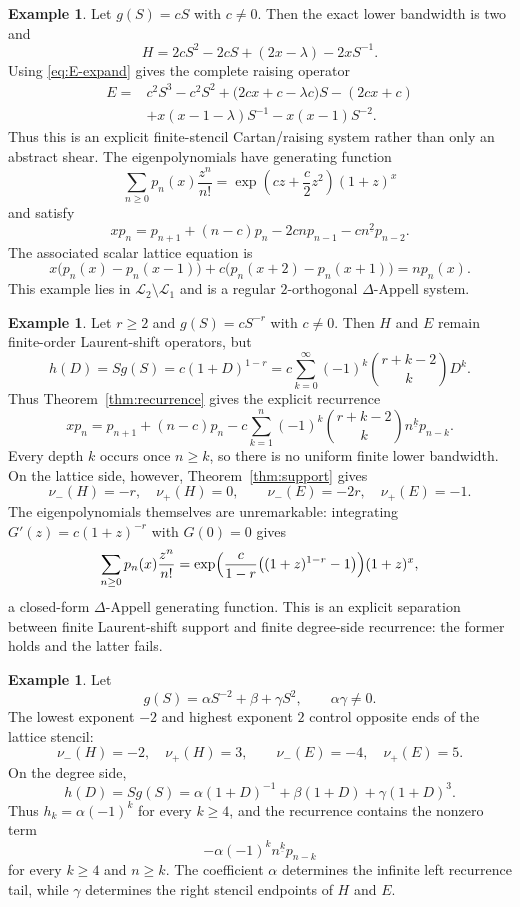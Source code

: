 \documentclass[11pt,reqno]{amsart}
\numberwithin{equation}{section}
\theoremstyle{definition}
\newtheorem{example}[theorem]{Example}
\theoremstyle{remark}
\newcommand{\calL}{\mathcal L}
\newcommand{\fall}[2]{#1^{\underline{#2}}}
\begin{document}
\begin{example}\label{ex:quadratic-band}
Let $g(S)=cS$ with $c\ne0$.  Then the exact lower bandwidth is two and
\[
 H=2cS^2-2cS+(2x-\lambda)-2xS^{-1}.
\]
Using \eqref{eq:E-expand} gives the complete raising operator
\[
\begin{aligned}
 E={}&c^2S^3-c^2S^2
 +\bigl(2cx+c-\lambda c\bigr)S
 -(2cx+c)\\
 &+x(x-1-\lambda)S^{-1}-x(x-1)S^{-2}.
\end{aligned}
\]
Thus this is an explicit finite-stencil Cartan/raising system rather than only an abstract shear.  The eigenpolynomials have generating function
\[
 \sum_{n\ge0}p_n(x)\frac{z^n}{n!}
 =\exp\!\left(cz+\frac{c}{2}z^2\right)(1+z)^x
\]
and satisfy
\[
 xp_n=p_{n+1}+(n-c)p_n-2cnp_{n-1}
 -c\fall{n}{2}p_{n-2}.
\]
The associated scalar lattice equation is
\[
 x\bigl(p_n(x)-p_n(x-1)\bigr)
 +c\bigl(p_n(x+2)-p_n(x+1)\bigr)=np_n(x).
\]
This example lies in $\calL_2\setminus\calL_1$ and is a regular $2$-orthogonal $\Delta$-Appell system.
\end{example}

\begin{example}\label{ex:negative-power}
Let $r\ge2$ and $g(S)=cS^{-r}$ with $c\ne0$.  Then $H$ and $E$ remain finite-order Laurent-shift operators, but
\[
 h(D)=Sg(S)=c(1+D)^{1-r}
 =c\sum_{k=0}^{\infty}(-1)^k\binom{r+k-2}{k}D^k.
\]
Thus Theorem~\ref{thm:recurrence} gives the explicit recurrence
\begin{equation}\label{eq:infinite-tail-example}
 xp_n=p_{n+1}+(n-c)p_n
 -c\sum_{k=1}^{n}(-1)^k\binom{r+k-2}{k}
 \fall{n}{k}p_{n-k}.
\end{equation}
Every depth $k$ occurs once $n\ge k$, so there is no uniform finite lower bandwidth.  On the lattice side, however, Theorem~\ref{thm:support} gives
\[
 \nu_-(H)=-r,
 \quad \nu_+(H)=0,
 \qquad
 \nu_-(E)=-2r,
 \quad \nu_+(E)=-1.
\]
The eigenpolynomials themselves are unremarkable: integrating $G'(z)=c(1+z)^{-r}$ with $G(0)=0$ gives
\[
 \sum_{n\ge0}p_n(x)\frac{z^n}{n!}
 =\exp\Bigl(\frac{c}{1-r}\bigl((1+z)^{1-r}-1\bigr)\Bigr)(1+z)^x,
\]
a closed-form $\Delta$-Appell generating function.  This is an explicit separation between finite Laurent-shift support and finite degree-side recurrence: the former holds and the latter fails.
\end{example}

\begin{example}\label{ex:mixed-shear}
Let
\[
 g(S)=\alpha S^{-2}+\beta+\gamma S^2,
 \qquad
 \alpha\gamma\ne0.
\]
The lowest exponent $-2$ and highest exponent $2$ control opposite ends of the lattice stencil:
\[
 \nu_-(H)=-2,
 \quad \nu_+(H)=3,
 \qquad
 \nu_-(E)=-4,
 \quad \nu_+(E)=5.
\]
On the degree side,
\[
 h(D)=Sg(S)=\alpha(1+D)^{-1}+\beta(1+D)+\gamma(1+D)^3.
\]
Thus $h_k=\alpha(-1)^k$ for every $k\ge4$, and the recurrence contains the nonzero term
\[
 -\alpha(-1)^k\fall{n}{k}p_{n-k}
\]
for every $k\ge4$ and $n\ge k$.  The coefficient $\alpha$ determines the infinite left recurrence tail, while $\gamma$ determines the right stencil endpoints of $H$ and $E$.
\end{example}
\end{document}
